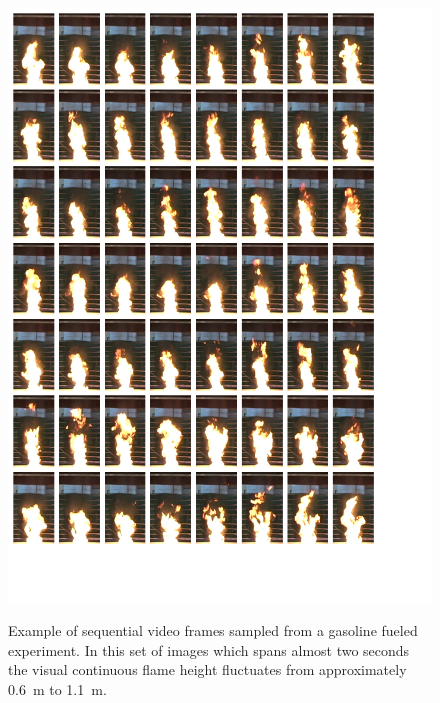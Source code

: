 \documentclass[twoside]{uocthesis}
\begin{document}
{\begin{figure}
	\centering
	\includegraphics[width=\textwidth]{../Figures/flame_height_comp_FHGAS}\\
	\caption[Example of sequential video frames sampled from a gasoline fueled experiment]{Example of sequential video frames sampled from a gasoline fueled experiment.  In this set of images which spans almost two seconds the visual continuous flame height fluctuates from approximately 0.6~m to 1.1~m.}
	\label{flame_height_comp_FHGAS_1}
\end{figure}

}
\end{document}
